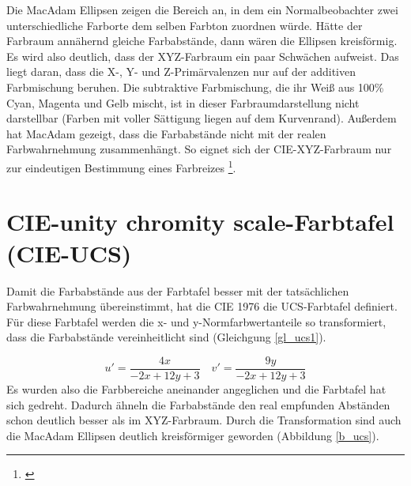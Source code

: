 \noindent Die MacAdam Ellipsen zeigen die Bereich an, in dem ein Normalbeobachter zwei unterschiedliche Farborte dem selben Farbton zuordnen würde. Hätte der Farbraum annähernd gleiche Farbabstände, dann wären die Ellipsen kreisförmig.\\
Es wird also deutlich, dass der XYZ-Farbraum ein paar Schwächen aufweist. Das liegt daran, dass die X-, Y- und Z-Primärvalenzen nur auf der additiven Farbmischung beruhen. Die subtraktive Farbmischung, die ihr Weiß aus 100\% Cyan, Magenta und Gelb mischt, ist in dieser Farbraumdarstellung nicht darstellbar (Farben  mit voller Sättigung liegen auf dem Kurvenrand). Außerdem hat MacAdam gezeigt, dass die Farbabstände nicht mit der realen Farbwahrnehmung zusammenhängt. So eignet sich der CIE-XYZ-Farbraum nur zur eindeutigen Bestimmung eines Farbreizes \footnote{\cite[79-80]{greule}}.

\newpage
\section{CIE-unity chromity scale-Farbtafel (CIE-UCS)} \label{sec_ucs}
Damit die Farbabstände aus der Farbtafel besser mit der tatsächlichen Farbwahrnehmung übereinstimmt, hat die CIE 1976 die UCS-Farbtafel definiert. Für diese Farbtafel werden die x- und y-Normfarbwertanteile so transformiert, dass die Farbabstände vereinheitlicht sind (Gleichgung \ref{gl_ucs1}).

\begin{equation}\label{gl_ucs1}
		u' = \frac{4x}{-2x+12y+3} \quad v' = \frac{9y}{-2x+12y+3}
\end{equation}
Es wurden also die Farbbereiche aneinander angeglichen und die Farbtafel hat sich gedreht. Dadurch ähneln die Farbabstände den real empfunden Abständen schon deutlich besser als im XYZ-Farbraum. Durch die Transformation sind auch die MacAdam Ellipsen deutlich kreisförmiger geworden (Abbildung \ref{b_ucs}).  

